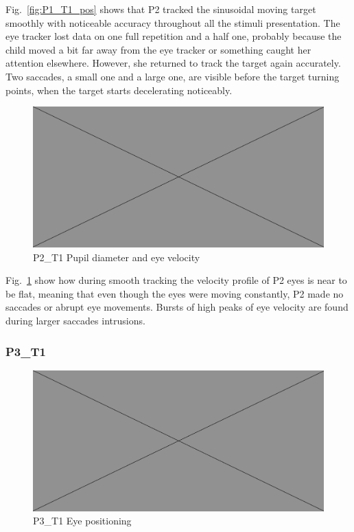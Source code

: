 Fig.~\ref{fig:P1_T1_pos} shows that P2 tracked the sinusoidal moving target smoothly with noticeable accuracy throughout all the stimuli presentation. The eye tracker lost data on one full repetition and a half one, probably because the child moved a bit far away from the eye tracker or something caught her attention elsewhere. However, she returned to track the target again accurately. Two saccades, a small one and a large one, are visible before the target turning points, when the target starts decelerating noticeably.

\begin{figure}[h]
  \centering
  \includegraphics[width=.5\textwidth]{figures/placeholderImg.jpg}
  \caption[P2\_T1 pupil velocity]{P2\_T1 Pupil diameter and eye velocity}
  \label{fig:P2_T1_vel}
\end{figure}

Fig.~\ref{fig:P2_T1_vel} show how during smooth tracking the velocity profile of P2 eyes is near to be flat, meaning that even though the eyes were moving constantly, P2 made no saccades or abrupt eye movements. Bursts of high peaks of eye velocity are found during larger saccades intrusions.



\subsubsection{P3\_T1}
\label{sec:P3_T1}

\begin{figure}[h]
  \centering
  \includegraphics[width=.5\textwidth]{figures/placeholderImg.jpg}
  \caption[P3\_T1 Eye positioning]{P3\_T1 Eye positioning}
  \label{fig:P3_T1_pos}
\end{figure}

